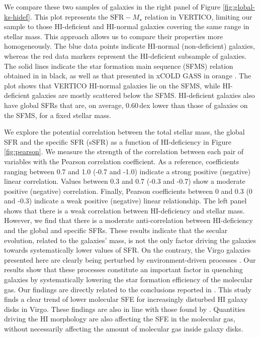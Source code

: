 \documentclass[longauth]{aa}
\begin{document}
We compare these two samples of galaxies in the right panel of Figure \ref{fig:global-ks-hidef}. This plot represents the $\textrm{SFR}-M_\star$ relation in VERTICO, limiting our sample to those HI-deficient and HI-normal galaxies covering the same range in stellar mass. This approach allows us to compare their properties more homogeneously. The blue data points indicate HI-normal (non-deficient) galaxies, whereas the red data markers represent the HI-deficient subsample of galaxies. The solid lines indicate the star formation main sequence (SFMS) relation obtained in \citet{Elbaz2007} in black, as well as that presented in xCOLD GASS in orange \citep{Saintonge2016}. The plot shows that VERTICO HI-normal galaxies lie on the SFMS, while HI-deficient galaxies are mostly scattered below the SFMS. HI-deficient galaxies also have global SFRs that are, on average, 0.60\,dex lower than those of galaxies on the SFMS, for a fixed stellar mass.

We explore the potential correlation between the total stellar mass, the global SFR and the specific SFR (sSFR) as a function of HI-deficiency in Figure \ref{fig:pearson}. We measure the strength of the correlation between each pair of variables with the Pearson correlation coefficient. As a reference, coefficients ranging between 0.7 and 1.0 (-0.7 and -1.0) indicate a strong positive (negative) linear correlation. Values between 0.3 and 0.7 (-0.3 and -0.7) show a moderate positive (negative) correlation. Finally, Pearson coefficients between 0 and 0.3 (0 and -0.3) indicate a weak positive (negative) linear relationship. The left panel shows that there is a weak correlation between HI-deficiency and stellar mass. However, we find that there is a moderate anti-correlation between HI-deficiency and the global and specific SFRs. These results indicate that the secular evolution, related to the galaxies' mass, is not the only factor driving the galaxies towards systematically lower values of SFR. On the contrary, the Virgo galaxies presented here are clearly being perturbed by environment-driven processes \citep[e.g.,][]{Chung2009,Yoon2017,Brown2021,Boselli2022,Zabel2022}. Our results show that these processes constitute an important factor in quenching galaxies by systematically lowering the star formation efficiency of the molecular gas.
 Our findings are directly related to the conclusions reported in \citet{Villanueva2022}. This study finds a clear trend of lower molecular SFE for increasingly disturbed HI galaxy disks in Virgo. These findings are also in line with those found by \citet{Zabel2022}. Quantities driving the HI morphology are also affecting the SFE in the molecular gas, without necessarily affecting the amount of molecular gas inside galaxy disks.
\end{document}
